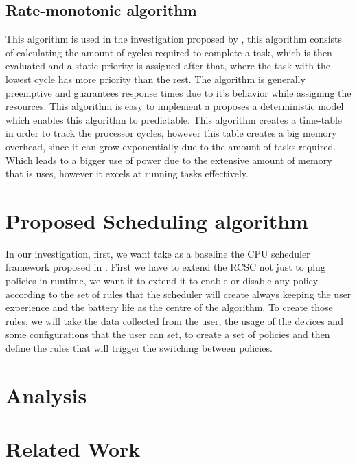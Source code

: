 \documentclass[conference]{IEEEtran}
\begin{document}
\subsection{Rate-monotonic algorithm}

This algorithm is used in the investigation proposed by \cite{BECKER01}, this algorithm consists of calculating the amount of cycles required to complete a task, which is then evaluated and a static-priority is assigned after that, where the task with the lowest cycle has more priority than the rest. The algorithm is generally preemptive and guarantees response times due to it's behavior while assigning the resources. 
This algorithm is easy to implement a proposes a deterministic model which enables this algorithm to predictable. This algorithm creates a time-table in order to track the processor cycles, however this table creates a big memory overhead, since it can grow exponentially due to the amount of tasks required. Which leads to a bigger use of power due to the extensive amount of memory that is uses, however it excels at running tasks effectively. 


\section{Proposed Scheduling algorithm}


In our investigation, first, we want take as a baseline the CPU scheduler framework proposed in \cite{ALMA01}. First we have to extend the RCSC not just to plug policies in runtime, we want it to extend it to enable or disable any policy according to the set of rules that the scheduler will create always keeping the user experience and the battery life as the centre of the algorithm. To create those rules, we will take the data collected from the user, the usage of the devices and some configurations that the user can set, to create a set of policies and then define the rules that will trigger the switching between policies.

\section{Analysis}

\section{Related Work}
\end{document}
